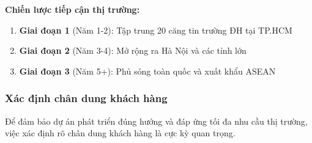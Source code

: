 \documentclass[12pt,a4paper]{article}
\begin{document}
\textbf{Chiến lược tiếp cận thị trường:}
\begin{enumerate}
    \item \textbf{Giai đoạn 1} (Năm 1-2): Tập trung 20 căng tin trường ĐH tại TP.HCM
    \item \textbf{Giai đoạn 2} (Năm 3-4): Mở rộng ra Hà Nội và các tỉnh lớn
    \item \textbf{Giai đoạn 3} (Năm 5+): Phủ sóng toàn quốc và xuất khẩu ASEAN
\end{enumerate}

\subsubsection{Xác định chân dung khách hàng}
Để đảm bảo dự án phát triển đúng hướng và đáp ứng tối đa nhu cầu thị trường, việc xác định rõ chân dung khách hàng là cực kỳ quan trọng.
\end{document}
